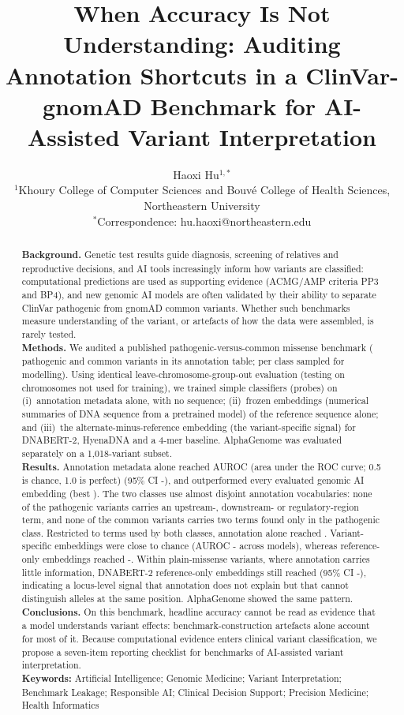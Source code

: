 \documentclass[11pt]{article}
\title{\textbf{When Accuracy Is Not Understanding: Auditing Annotation Shortcuts in a ClinVar-gnomAD Benchmark for AI-Assisted Variant Interpretation}}
\author{%
  Haoxi Hu$^{1,*}$\\[2pt]
  \small $^{1}$Khoury College of Computer Sciences and Bouv\'e College of Health Sciences, Northeastern University\\ $^{*}$Correspondence: hu.haoxi@northeastern.edu}
\date{}
\newcommand{\ci}[2]{{\small(95\% CI #1-#2)}}
\begin{document}
\maketitle

\begin{abstract}
\noindent\textbf{Background.} Genetic test results guide diagnosis, screening of relatives and reproductive decisions, and AI tools increasingly inform how variants are classified: computational predictions are used as supporting evidence (ACMG/AMP criteria PP3 and BP4), and new genomic AI models are often validated by their ability to separate ClinVar pathogenic from gnomAD common variants. Whether such benchmarks measure understanding of the variant, or artefacts of how the data were assembled, is rarely tested.\\
\textbf{Methods.} We audited a published pathogenic-versus-common missense benchmark (\TabNPath{} pathogenic and \TabNCommon{} common variants in its annotation table; \NPerClass{} per class sampled for modelling). Using identical leave-chromosome-group-out evaluation (testing on chromosomes not used for training), we trained simple classifiers (probes) on (i)~annotation metadata alone, with no sequence; (ii)~frozen embeddings (numerical summaries of DNA sequence from a pretrained model) of the reference sequence alone; and (iii)~the alternate-minus-reference embedding (the variant-specific signal) for DNABERT-2, HyenaDNA and a 4-mer baseline. AlphaGenome was evaluated separately on a 1{,}018-variant subset.\\
\textbf{Results.} Annotation metadata alone reached AUROC (area under the ROC curve; 0.5 is chance, 1.0 is perfect) \MetaAll{} \ci{\MetaAllLo}{\MetaAllHi}, and outperformed every evaluated genomic AI embedding (best \DnbRef). The two classes use almost disjoint annotation vocabularies: none of the \TabNPath{} pathogenic variants carries an upstream-, downstream- or regulatory-region term, and none of the common variants carries two terms found only in the pathogenic class. Restricted to terms used by both classes, annotation alone reached \MetaShared. Variant-specific embeddings were close to chance (AUROC \KmDelta-\HynDelta{} across models), whereas reference-only embeddings reached \KmRef-\DnbRef. Within plain-missense variants, where annotation carries little information, DNABERT-2 reference-only embeddings still reached \DnbRefPure{} \ci{\DnbRefPureLo}{\DnbRefPureHi}, indicating a locus-level signal that annotation does not explain but that cannot distinguish alleles at the same position. AlphaGenome showed the same pattern.\\
\textbf{Conclusions.} On this benchmark, headline accuracy cannot be read as evidence that a model understands variant effects: benchmark-construction artefacts alone account for most of it. Because computational evidence enters clinical variant classification, we propose a seven-item reporting checklist for benchmarks of AI-assisted variant interpretation.\\[4pt]
\textbf{Keywords:} Artificial Intelligence; Genomic Medicine; Variant Interpretation; Benchmark Leakage; Responsible AI; Clinical Decision Support; Precision Medicine; Health Informatics
\end{abstract}
\end{document}
